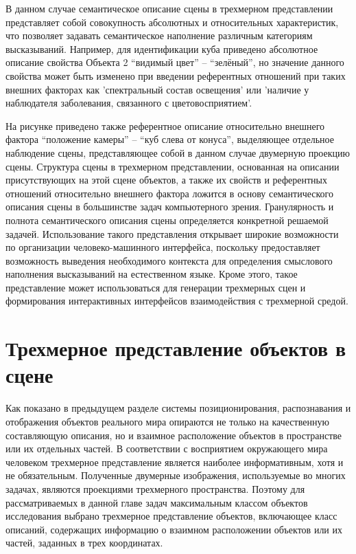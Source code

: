 В данном случае семантическое описание сцены в трехмерном представлении представляет собой совокупность абсолютных и относительных характеристик, что позволяет задавать семантическое наполнение различным категориям высказываний. Например, для идентификации куба приведено абсолютное описание свойства Объекта 2 ``видимый цвет'' -- ``зелёный'', но значение данного свойства может быть изменено при введении референтных отношений при таких внешних факторах как 'спектральный состав освещения' или 'наличие у наблюдателя заболевания, связанного с цветовосприятием'. 

На рисунке приведено также референтное описание относительно внешнего фактора ``положение камеры'' -- ``куб слева от конуса'', выделяющее отдельное наблюдение сцены, представляющее собой в данном случае двумерную проекцию сцены. Структура сцены в трехмерном представлении, основанная на описании присутствующих на этой сцене объектов, а также их свойств и референтных отношений относительно внешнего фактора ложится в основу семантического описания сцены в большинстве задач компьютерного зрения. Гранулярность и полнота семантического описания сцены определяется конкретной решаемой задачей. Использование такого представления открывает широкие возможности по организации человеко-машинного интерфейса, поскольку предоставляет возможность выведения необходимого контекста для определения смыслового наполнения высказываний на естественном языке. Кроме этого, такое представление может использоваться для генерации трехмерных сцен и формирования интерактивных интерфейсов взаимодействия с трехмерной средой.


\section{Трехмерное представление объектов в сцене}
\label{sec_3d_models_representation}

Как показано в предыдущем разделе системы позиционирования, распознавания и отображения объектов реального мира опираются не только на качественную составляющую описания, но и взаимное расположение объектов в пространстве или их отдельных частей. В соответствии с восприятием окружающего мира человеком трехмерное представление является наиболее информативным, хотя и не обязательным. Полученные двумерные изображения, используемые во многих задачах, являются проекциями трехмерного пространства. Поэтому для рассматриваемых в данной главе задач максимальным классом объектов исследования выбрано трехмерное представление объектов, включающее класс описаний, содержащих информацию о взаимном расположении объектов или их частей, заданных в трех координатах.

